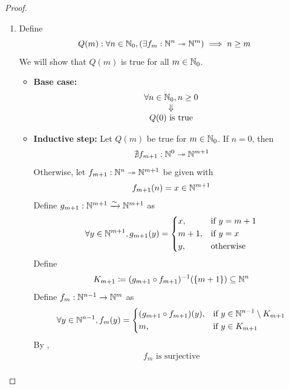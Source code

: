 \begin{proof}
\begin{enumerate}[label=\textbf{(\Alph*)}]
\begin{itemize}
\[            \]
        \end{itemize}
        By the \emph{principle of mathematical induction}, $P(n)$ is true for all $n \in \N_{0}$.
        \item Define
        \[
        Q(m): \forall n \in \N_{0}, \paren*{\exists f_{m}: \N^{n} \twoheadrightarrow \N^{m}} \implies n \geq m
        \]
        We will show that $Q(m)$ is true for all $m \in \N_{0}$.
        \begin{itemize}
            \item \textbf{Base case:}
            \[
            \begin{array}{c}
                \forall n \in \N_{0}, n \geq 0 \\
                \Downarrow \\
                Q(0) \text{ is true}
            \end{array}
            \]
            \item \textbf{Inductive step:} Let $Q(m)$ be true for $m \in \N_{0}$. If $n = 0$, then
            \[
            \nexists f_{m + 1}: \N^{0} \twoheadrightarrow \N^{m + 1}
            \]
            Otherwise, let $f_{m + 1}: \N^{n} \twoheadrightarrow \N^{m + 1}$ be given with
            \[
            f_{m + 1}(n) = x \in \N^{m + 1}
            \]
            Define $g_{m + 1}: \N^{m + 1} \xrightarrow{\sim} \N^{m + 1}$ as
            \[
            \forall y \in \N^{m + 1}, g_{m + 1}(y) = \begin{dcases}
                x, & \text{if } y = m + 1 \\
                m + 1, & \text{if } y = x \\
                y, & \text{otherwise}
            \end{dcases}
            \]
            Define
            \[
            K_{m + 1} \coloneqq (g_{m + 1} \circ f_{m + 1})^{-1}(\set*{m + 1}) \subseteq \N^{n}
            \]
            Define $f_{m}: \N^{n - 1} \to \N^{m}$ as
            \[
            \forall y \in \N^{n - 1}, f_{m}(y) = \begin{dcases}
                (g_{m + 1} \circ f_{m + 1})(y), & \text{if } y \in \N^{n - 1} \setminus K_{m + 1} \\
                m, & \text{if } y \in K_{m + 1}
            \end{dcases}
            \]
            By ,
            \[
            \begin{array}{c}
                f_{m} \text{ is surjective} \\

\end{array}\]
\end{itemize}
\end{enumerate}
\end{proof}
